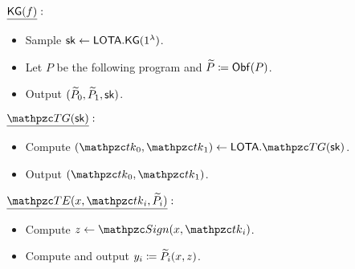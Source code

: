 \begin{description}
\item $\underline{\mathsf{KG}(f)}:$
\begin{itemize}
\item Sample $\mathsf{sk} \leftarrow \mathsf{LOTA}.\mathsf{KG}(1^\lambda)$.
\item Let $P$ be the following program and $\widetilde{P} \coloneqq \mathsf{Obf}(P)$.

\item Output $(\widetilde{P}_0, \widetilde{P}_1, \mathsf{sk})$.
\end{itemize}

\item $\underline{\TG(\sk)}:$
\begin{itemize}
\item Compute $(\qtk_0, \qtk_1) \gets \LOTA.\TG(\sk)$.
\item Output $(\qtk_0, \qtk_1)$.
\end{itemize}

\item $\underline{\TE(x, \qtk_i, \tP_i)}:$
\begin{itemize}
\item Compute $z \gets \qSign(x, \qtk_i)$.
\item Compute and output $y_i \coloneqq \widetilde{P}_i(x, z)$.
\end{itemize}


\end{description}
